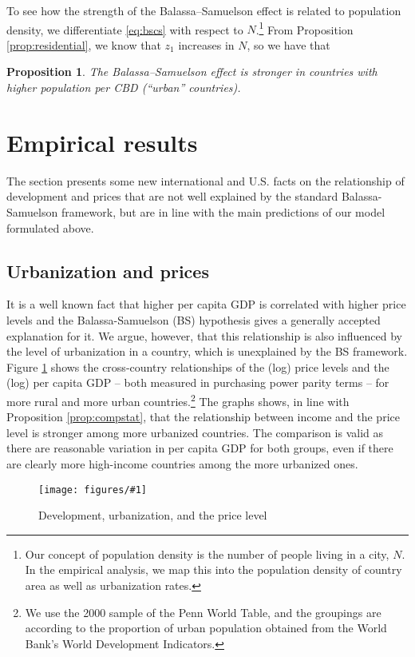 \documentclass[12pt]{article}
\newtheorem{proposition}{Proposition}
\newcommand{\dofigure}[2]{\begin{figure}
\begin{centering}
\texttt{[image: figures/\#1]}
  \caption{#2\label{fig:#1}}
\end{centering}
\end{figure}}
\begin{document}
To see how the strength of the Balassa--Samuelson effect is related to population density, we differentiate \eqref{eq:bscs} with respect to $N$.\footnote{Our concept of population density is the number of people living in a city, $N$. In the empirical analysis, we map this into the population density of country area as well as urbanization rates.} From Proposition \ref{prop:residential}, we know that $z_1$ increases in $N$, so we have that
\begin{proposition}
The Balassa--Samuelson effect is stronger in countries with higher population per CBD (``urban'' countries).
\end{proposition}


\section{Empirical results}\label{empirics}
The section presents some new international and U.S. facts on the relationship of development and prices that are not well explained by the standard Balassa-Samuelson framework, but are in line with the main predictions of our model formulated above.

\subsection{Urbanization and prices}
It is a well known fact that higher per capita GDP is correlated with higher price levels and the Balassa-Samuelson (BS) hypothesis gives a generally accepted explanation for it. We argue, however, that this relationship is also influenced by the level of urbanization in a country, which is unexplained by the BS framework. Figure \ref{fig:sc_penn} shows the cross-country relationships of the (log) price levels and the (log) per capita GDP -- both measured in purchasing power parity terms -- for more rural and more urban countries.\footnote{We use the 2000 sample of the Penn World Table, and the groupings are according to the proportion of urban population obtained from the World Bank's World Development Indicators.} The graphs shows, in line with Proposition \ref{prop:compstat}, that the relationship between income and the price level is stronger among more urbanized countries. The comparison is valid as there are reasonable variation in per capita GDP for both groups, even if there are clearly more high-income countries among the more urbanized ones.

\dofigure{sc_penn}{Development, urbanization, and the price level}
\end{document}
